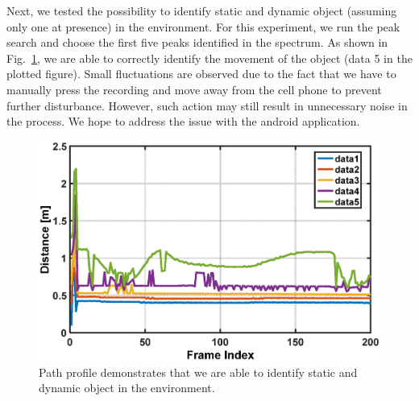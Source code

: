 Next, we tested the possibility to identify static and dynamic object (assuming only one at presence) in the environment. For this experiment, we run the peak search and choose the first five peaks identified in the spectrum. As shown in Fig.~\ref{fig:path}, we are able to correctly identify the movement of the object (data 5 in the plotted figure). Small fluctuations are observed due to the fact that we have to manually press the recording and move away from the cell phone to prevent further disturbance. However, such action may still result in unnecessary noise in the process. We hope to address the issue with the android application.

%
\begin{figure}[!htbp]
	\centering
	\includegraphics[width=0.9\columnwidth]{Fig03_path}
	\captionsetup{justification=raggedright, singlelinecheck=false}
	\caption{Path profile demonstrates that we are able to identify static and dynamic object in the environment.}
	\label{fig:path}
\end{figure}
%




